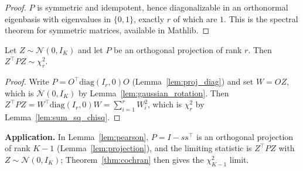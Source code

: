 \begin{proof}
$P$ is symmetric and idempotent, hence diagonalizable in an orthonormal
eigenbasis with eigenvalues in $\{0,1\}$, exactly $r$ of which are $1$. This is
the spectral theorem for symmetric matrices, available in Mathlib.
\end{proof}

\begin{theorem}\label{thm:cochran}
Let $Z\sim\mathcal{N}(0,I_K)$ and let $P$ be an orthogonal projection of rank $r$.
Then $Z^\top P Z\sim\chi^2_r$.
\end{theorem}

\begin{proof}
Write $P = O^\top\mathrm{diag}(I_r,0)O$ (Lemma~\ref{lem:proj_diag}) and set
$W = OZ$, which is $\mathcal{N}(0,I_K)$ by Lemma~\ref{lem:gaussian_rotation}.
Then $Z^\top P Z = W^\top\mathrm{diag}(I_r,0)W = \sum_{i=1}^r W_i^2$, which is
$\chi^2_r$ by Lemma~\ref{lem:sum_sq_chisq}.
\end{proof}

\textbf{Application.} In Lemma~\ref{lem:pearson}, $P = I - ss^\top$ is an
orthogonal projection of rank $K-1$ (Lemma~\ref{lem:projection}), and the limiting
statistic is $Z^\top P Z$ with $Z\sim\mathcal{N}(0,I_K)$; Theorem~\ref{thm:cochran}
then gives the $\chi^2_{K-1}$ limit.

